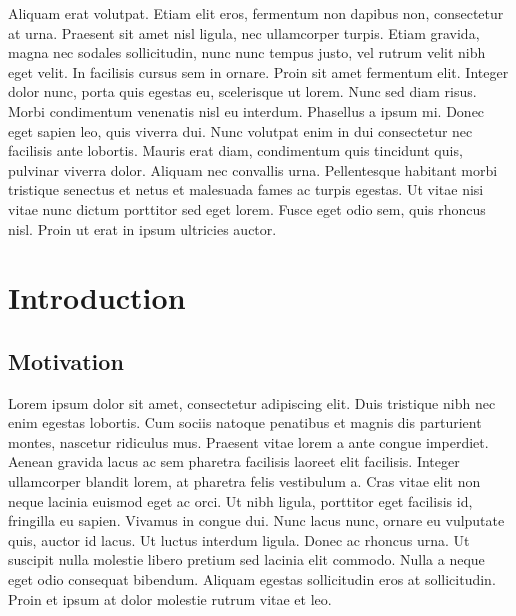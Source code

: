\documentclass[12pt]{report}	%
\begin{document}
\begin{acknowledgments}
Aliquam erat volutpat. Etiam elit eros, fermentum non dapibus non,
consectetur at urna. Praesent sit amet nisl ligula, nec ullamcorper
turpis. Etiam gravida, magna nec sodales sollicitudin, nunc nunc tempus
justo, vel rutrum velit nibh eget velit. In facilisis cursus sem in
ornare. Proin sit amet fermentum elit. Integer dolor nunc, porta quis
egestas eu, scelerisque ut lorem. Nunc sed diam risus. Morbi condimentum
venenatis nisl eu interdum. Phasellus a ipsum mi. Donec eget sapien leo,
quis viverra dui. Nunc volutpat enim in dui consectetur nec facilisis
ante lobortis. Mauris erat diam, condimentum quis tincidunt quis,
pulvinar viverra dolor. Aliquam nec convallis urna. Pellentesque
habitant morbi tristique senectus et netus et malesuada fames ac turpis
egestas. Ut vitae nisi vitae nunc dictum porttitor sed eget lorem. Fusce
eget odio sem, quis rhoncus nisl. Proin ut erat in ipsum ultricies
auctor.
\end{acknowledgments}

\tableofcontents   
\listoftables      
\listoffigures     

%
%
%
%

\chapter{Introduction}
\section{Motivation}
Lorem ipsum dolor sit amet, consectetur adipiscing elit. Duis tristique
nibh nec enim egestas lobortis. Cum sociis natoque penatibus et magnis
dis parturient montes, nascetur ridiculus mus. Praesent vitae lorem a
ante congue imperdiet. Aenean gravida lacus ac sem pharetra facilisis
laoreet elit facilisis. Integer ullamcorper blandit lorem, at pharetra
felis vestibulum a. Cras vitae elit non neque lacinia euismod eget ac
orci. Ut nibh ligula, porttitor eget facilisis id, fringilla eu
sapien. Vivamus in congue dui. Nunc lacus nunc, ornare eu vulputate
quis, auctor id lacus. Ut luctus interdum ligula. Donec ac rhoncus
urna. Ut suscipit nulla molestie libero pretium sed lacinia elit
commodo. Nulla a neque eget odio consequat bibendum. Aliquam egestas
sollicitudin eros at sollicitudin. Proin et ipsum at dolor molestie
rutrum vitae et leo.
\end{document}
